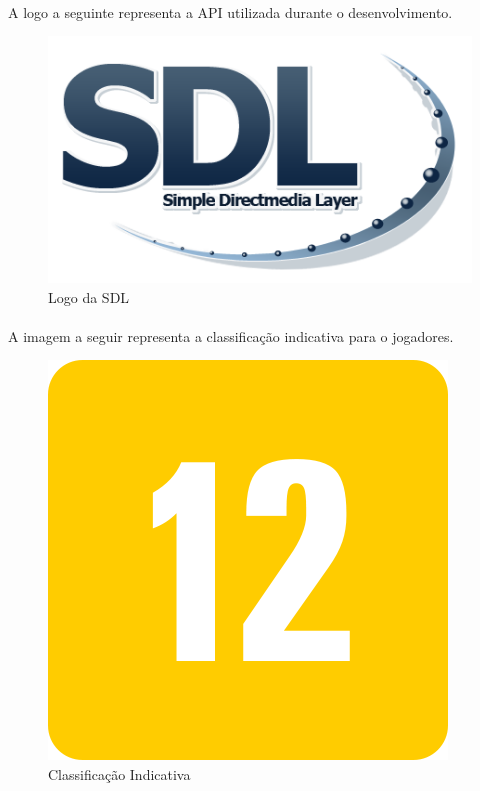 \documentclass[11pt]{article} %
\begin{document}
\paragraph{} A logo a seguinte representa a API utilizada durante o desenvolvimento.

\begin{figure}[!htp]
\centering
\includegraphics[scale=0.6]{res/Sdl-logo.png}
\caption{Logo da SDL}
\label{Logo da SDL}
\end{figure}

\paragraph{} A imagem a seguir representa a classificação indicativa para o jogadores.

\begin{figure}[!htp]
\centering
\includegraphics[scale=0.5]{res/classification.png}
\caption{Classificação Indicativa}
\label{Classificação Indicativa}
\end{figure}
\end{document}
